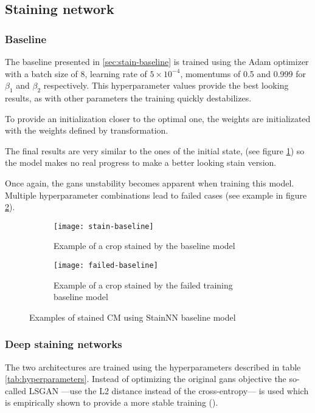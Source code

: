\documentclass[../main.tex]{subfiles}
\begin{document}
\subsection{Staining network}
\subsubsection{Baseline}
The baseline presented in \ref{sec:stain-baseline} is trained using the
Adam optimizer
with a batch size of 8, learning rate of $5 \times 10^{-4}$, momentums of
0.5 and 0.999 for $\beta_1$ and $\beta_2$ respectively. This hyperparameter
values provide the best looking results, as with other parameters the training
quickly destabilizes.

To provide an initialization closer to the optimal one, the weights are
initializated with the weights defined by \cite{Gareau2009} transformation.

The final results are very similar to the ones of the initial state,
(see figure \ref{fig:stain-baseline})
so the model makes no real progress to make a better looking stain version.

Once again, the \gls{gans} unstability becomes apparent when training this model.
Multiple hyperparameter combinations lead to failed cases (see example in figure
\ref{fig:failed-baseline}).

\begin{figure}[p]
\centering
\begin{subfigure}{.5\textwidth}
\centering
\captionsetup{width=.8\linewidth}
\texttt{[image: stain-baseline]}
\caption{Example of a crop stained by the baseline model}
\label{fig:stain-baseline}
\end{subfigure}%
\begin{subfigure}{.5\textwidth}
\centering
\captionsetup{width=.8\linewidth}
\texttt{[image: failed-baseline]}
\caption{Example of a crop stained by the failed training baseline model}
\label{fig:failed-baseline}
\end{subfigure}
\caption{Examples of stained CM using StainNN baseline model}
\label{fig:baseline-examples}
\end{figure}

\subsubsection{Deep staining networks}\label{sec:deep-stain}

The two architectures are trained using the hyperparameters described
in table \ref{tab:hyperparameters}.
Instead of optimizing the original \gls{gans} objective
the so-called LSGAN ---use the L2 distance instead of the cross-entropy---
is used which is empirically shown to provide a more
stable training (\cite{lsgan}).
\end{document}
